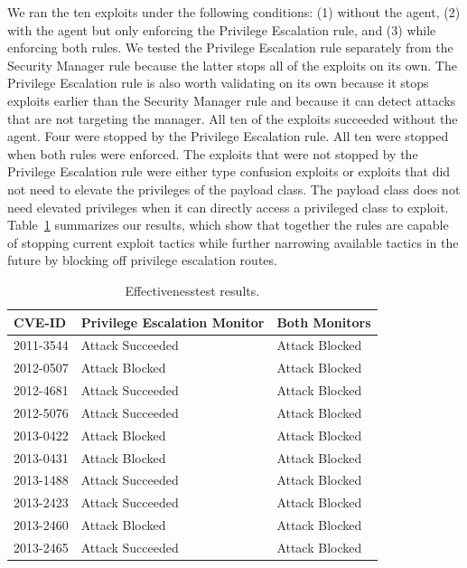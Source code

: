 \documentclass{sig-alternate}
\begin{document}
We ran the ten exploits under the following conditions:
(1) without the agent, (2) with the agent but only enforcing the Privilege
Escalation rule, and (3) while enforcing both rules. We tested the Privilege
Escalation rule separately from the Security Manager rule because the latter
stops all of the exploits on its own. The Privilege Escalation rule is also worth validating on its own because it stops exploits earlier than the Security Manager rule and because it can detect attacks that are not targeting the manager. All  
ten of the exploits succeeded without the agent. Four
were stopped by the Privilege Escalation rule. All ten were stopped
when both rules were enforced. The exploits that were not stopped
by the Privilege Escalation rule were either type confusion exploits
or exploits that did not need to elevate the privileges of the payload
class. The payload class does not need elevated privileges when it
can directly access a privileged class to exploit. Table~\ref{tab:Exploit-experiment-summary}
summarizes our results, which show that together the rules are capable of stopping current exploit tactics while further narrowing available tactics in the future by blocking off privilege escalation routes.

\begin{table}
\caption{Effectiveness\label{tab:Exploit-experiment-summary} test results.}
\begin{tabular}{l>{\raggedright}p{3cm}l}
\toprule 
\textbf{CVE-ID} & \textbf{Privilege Escalation Monitor} & \textbf{Both Monitors}\tabularnewline
\midrule
2011-3544 & Attack Succeeded  & Attack Blocked\tabularnewline
2012-0507 & Attack Blocked & Attack Blocked\tabularnewline
2012-4681 & Attack Succeeded  & Attack Blocked\tabularnewline
2012-5076 & Attack Succeeded  & Attack Blocked\tabularnewline
2013-0422 & Attack Blocked & Attack Blocked\tabularnewline
2013-0431 & Attack Blocked & Attack Blocked\tabularnewline
2013-1488 & Attack Succeeded  & Attack Blocked\tabularnewline
2013-2423 & Attack Succeeded  & Attack Blocked\tabularnewline
2013-2460 & Attack Blocked & Attack Blocked\tabularnewline
2013-2465 & Attack Succeeded  & Attack Blocked\tabularnewline
\bottomrule
\end{tabular}
\end{table}
\end{document}
